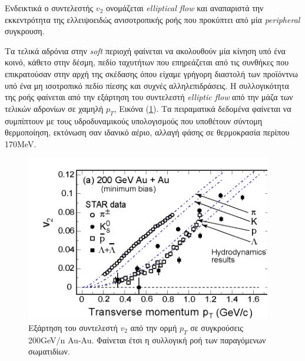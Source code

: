  	Ενδεικτικά ο συντελεστής $v_2$ ονομάζεται \textit{elliptical flow} και αναπαριστά την εκκεντρότητα της ελλειψοειδώς ανισοτροπικής ροής που προκύπτει από μία \textit{peripheral} συγκρουση.
 
	Τα τελικά αδρόνια στην \textit{soft} περιοχή φαίνεται να ακολουθούν μία κίνηση υπό ένα κοινό, κάθετο στην δέσμη, πεδίο ταχυτήτων που επηρεάζεται από τις συνθήκες που επικρατούσαν στην αρχή της σκέδασης όπου είχαμε γρήγορη διαστολή των προϊόντνω υπό ένα μη ισοτροπικό πεδίο πίεσης και συχνές αλληλεπιδράσεις.
	Η συλλογικότητα της ροής φαίνεται από την εξάρτηση του συντελεστή \textit{elliptic flow} από την μάζα των τελικών αδρονίων σε χαμηλή $p_T$, Εικόνα (\ref{fig4.5}). Τα πειραματικά δεδομένα φαίνεται να συμπίπτουν με τους υδροδυναμικούς υπολογισμούς που υποθέτουν σύντομη θερμοποίηση, εκτόνωση σαν ιδανικό αέριο, αλλαγή φάσης σε θερμοκρασία περίπου 170MeV. 

\begin{figure}[h!]
	\centering
	\includegraphics[scale=0.8]{STAR_Results/result_soft_1}
	\caption{Εξάρτηση του συντελεστή $v_2$ από την ορμή $p_T$ σε συγκρούσεις 200GeV/n Au-Au. Φαίνεται έτσι η συλλογική ροή των παραγόμενων σωματιδίων. }
	\label{fig4.5}
\end{figure}

